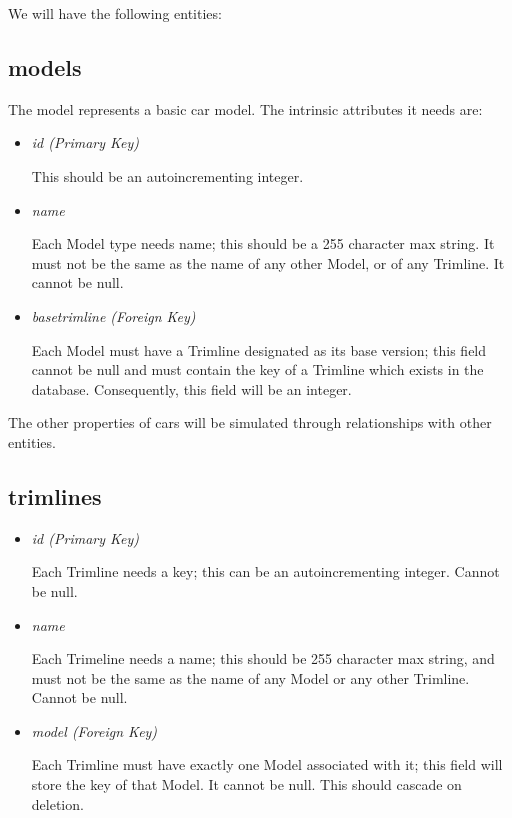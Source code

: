 \documentclass[11pt,letterpaper,oneside]{amsart}
\begin{document}
We will have the following entities:

\subsection*{models}
The model represents a basic car model.  The intrinsic attributes it needs are:
\begin{itemize}
	\item \emph{id (Primary Key)}
	
	This should be an autoincrementing integer.
	
	\item \emph{name}
	
	Each Model type needs name; this should be a 255 character max string.  It must not be the same as the name of any other Model, or of any Trimline.  It cannot be null.
	
	\item \emph{base{\textunderscore}trimline (Foreign Key)}
	
	Each Model must have a Trimline designated as its base version; this field cannot be null and must contain the key of a Trimline which exists in the database.  Consequently, this field will be an integer.
	
	
\end{itemize}

The other properties of cars will be simulated through relationships with other entities.

\subsection*{trimlines}

\begin{itemize}
	\item \emph{id (Primary Key)}
	
	Each Trimline needs a key; this can be an autoincrementing integer. Cannot be null.
	
	\item \emph{name}
	
	Each Trimeline needs a name; this should be 255 character max string, and must not be the same as the name of any Model or any other Trimline.  Cannot be null.

	\item \emph{model (Foreign Key)}
	
	Each Trimline must have exactly one Model associated with it; this field will store the key of that Model.  It cannot be null.  This should cascade on deletion.
	

\end{itemize}
\end{document}
